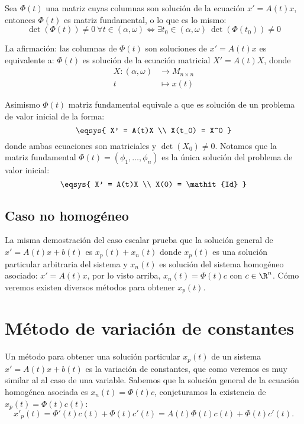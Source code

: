 \documentclass[../main.tex]{subfiles}
\begin{document}
\begin{corollary}
	Sea \(\Phi(t)\) una matriz cuyas columnas son solución de la ecuación
	\(x' = A(t)x\), entonces \(\Phi(t)\) es matriz fundamental, o lo que es lo
	mismo:
	\[\det(\Phi(t)) \neq 0 \ \forall t \in (\alpha, \omega)
		\iff \exists t_0 \in (\alpha, \omega) \ \det(\Phi(t_0)) \neq 0\]
\end{corollary}

La afirmación: las columnas de \(\Phi(t)\) son soluciones de \(x' = A(t)x\) es
equivalente a: \(\Phi(t)\) es solución de la ecuación matricial \(X' = A(t)X\),
donde
\begin{align*}
	X : (\alpha, \omega) &\to M_{n \times n} \\
	t &\mapsto x(t)
\end{align*}

Asimismo \(\Phi(t)\) matriz fundamental equivale a que es solución de un
problema de valor inicial de la forma:
\[\eqsys{
	X' = A(t)X \\
	X(t_0) = X^0
}\]
donde ambas ecuaciones son matriciales y \(\det(X_0) \neq 0\). Notamos que la 
matriz fundamental \(\Phi(t) = (\phi_1, \dots, \phi_n)\) es la única solución
del problema de valor inicial:
\[\eqsys{
	X' = A(t)X \\
	X(0) = \mathit{Id}
	}\]

\subsection{Caso no homogéneo}

La misma demostración del caso escalar prueba que la solución general de 
\(x' = A(t)x + b(t)\) es \(x_p(t) + x_n(t)\) donde \(x_p(t)\) es una solución
particular arbitraria del sistema y \(x_n(t)\) es solución del sistema
homogéneo asociado: \(x' = A(t)x\), por lo visto arriba, \(x_n(t) = \Phi(t)c\)
con \(c \in \R^n\). Cómo veremos existen diversos métodos para obtener 
\(x_p(t)\).

\section{Método de variación de constantes}

Un método para obtener una solución particular \(x_p(t)\) de un sistema 
\(x' = A(t)x + b(t)\) es la variación de constantes, que como veremos es muy
similar al al caso de una variable. Sabemos que la solución general de la
ecuación homogénea asociada es \(x_n(t) = \Phi(t)c\), conjeturamos la existencia
de \(x_p(t) = \Phi(t) c(t)\):
\[x'_p(t) = \Phi'(t) c(t) + \Phi(t) c'(t) = A(t )\Phi(t) c(t) + \Phi(t) c'(t).\]
\end{document}

